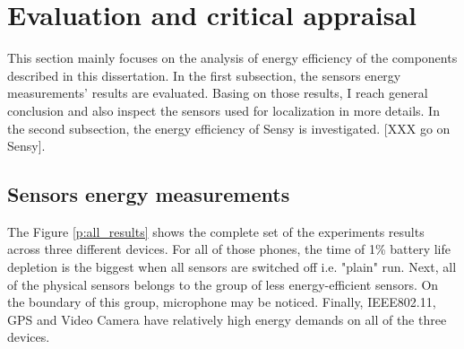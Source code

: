 \section{Evaluation and critical appraisal}
\label{s:evaluation}

This section mainly focuses on the analysis of energy efficiency of the components described in this dissertation. In the first subsection, the sensors energy measurements' results are evaluated. Basing on those results, I reach general conclusion and also inspect the sensors used for localization in more details.  In the second subsection, the energy efficiency of Sensy is investigated. [XXX go on Sensy].

\subsection{Sensors energy measurements}

The Figure \ref{p:all_results} shows the complete set of the experiments results across three different devices. For all of those phones, the time of 1\% battery life depletion is the biggest when all sensors are switched off i.e. "plain" run. Next, all of the physical sensors belongs to the group of less energy-efficient sensors. On the boundary of this group, microphone may be noticed. Finally, IEEE802.11, GPS and Video Camera have relatively high energy demands on all of the three devices.


